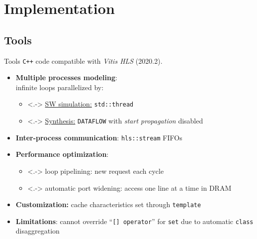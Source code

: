 \documentclass{beamer}
\begin{document}
\section{Implementation}
\subsection{Tools}
\begin{frame}{Tools}
	\texttt{C++} code compatible with \emph{Vitis HLS} (2020.2).
	\pause
	\begin{itemize}[<+->]
		\item \textbf{Multiple processes modeling}:\\
			infinite loops parallelized by:
			\begin{itemize}
				\item<.-> \underline{SW simulation:} \texttt{std::thread}
				\item<.-> \underline{Synthesis:} \texttt{DATAFLOW} with
					\textit{start propagation} disabled
			\end{itemize}
		\item \textbf{Inter-process communication}: \texttt{hls::stream} FIFOs
		\item \textbf{Performance optimization}:
			\begin{itemize}
				\item<.-> loop pipelining: new request each cycle
				\item<.-> automatic port widening: access one line at a time in DRAM
			\end{itemize}
		\item \textbf{Customization:} cache characteristics set through
			\texttt{template}
		\item \textbf{Limitations}: cannot override ``\texttt{[]~operator}''
			for \texttt{set} due to automatic \texttt{class} disaggregation
	\end{itemize}
\end{frame}
\end{document}
